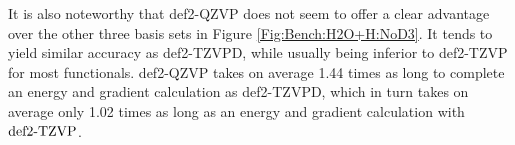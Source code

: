 It is also noteworthy that def2-QZVP does not seem to offer a clear advantage over the
other three basis sets in Figure \ref{Fig:Bench:H2O+H:NoD3}. It tends to yield
similar accuracy as def2-TZVPD, while usually being inferior to def2-TZVP for
most functionals. def2-QZVP takes on average 1.44 times as long to complete an
energy and gradient calculation as def2-TZVPD, which in turn takes
on average only 1.02 times as long as an energy and gradient calculation with
$\text{def2-TZVP}$.

\begin{figure}[b!]
\centering
% 

\end{figure}
